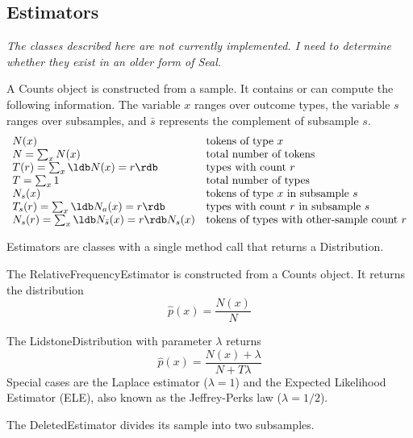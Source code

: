 \subsection{Estimators}

{\it The classes described here are not currently implemented.  I need
  to determine whether they exist in an older form of Seal.}

A {\df Counts} object is constructed from a sample.  It contains or
can compute the following information.  The variable $x$ ranges over
outcome types, the variable $s$ ranges over subsamples, and $\bar{s}$
represents the complement of subsample $s$.
\[\begin{array}{ll}
N(x)            & \mbox{tokens of type $x$}\\
N = \sum_x N(x) & \mbox{total number of tokens}\\
T(r) = \sum_x \ldb N(x) = r \rdb & \mbox{types with count $r$}\\
T = \sum_x 1 & \mbox{total number of types}\\
N_s(x) & \mbox{tokens of type $x$ in subsample $s$}\\
T_s(r) = \sum_x \ldb N_a(x) = r \rdb & \mbox{types with
  count $r$ in subsample $s$}\\
N_s(r) = \sum_x \ldb N_{\bar{s}}(x) = r \rdb N_s(x) & \mbox{tokens of
  types with other-sample count $r$}
\end{array}\]

Estimators are classes with a single method {\df call} that
returns a {\df Distribution}.

The {\df RelativeFrequencyEstimator} is constructed from a
{\df Counts} object.  It returns the distribution
\[ \hat{p}(x) = \frac{N(x)}{N} \]

The {\df LidstoneDistribution} with parameter $\lambda$ returns
\[ \hat{p}(x) = \frac{N(x) + \lambda}{N + T\lambda} \]
Special cases are the Laplace estimator ($\lambda = 1$) and the
Expected Likelihood Estimator (ELE), also known as the Jeffrey-Perks
law ($\lambda = 1/2$).

The {\df DeletedEstimator} divides its sample into two subsamples.
